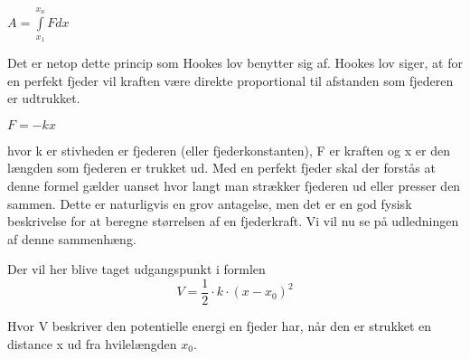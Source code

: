 \begin{center}
$A = \int\limits_{x_1}^{x_n} F dx$ 
\end{center}
\bigskip

Det er netop dette princip som Hookes lov benytter sig af. Hookes lov siger, at for en perfekt fjeder vil kraften være direkte proportional til afstanden som fjederen er udtrukket. 

\begin{center}
$F = -kx$
\end{center}
\bigskip

hvor k er stivheden er fjederen (eller fjederkonstanten), F er kraften og x er den længden som fjederen er trukket ud. Med en perfekt fjeder skal der forstås at denne formel gælder uanset hvor langt man strækker fjederen ud eller presser den sammen. Dette er naturligvis en grov antagelse, men det er en god fysisk beskrivelse for at beregne størrelsen af en fjederkraft. Vi vil nu se på udledningen af denne sammenhæng.

Der vil her blive taget udgangspunkt i formlen 
\begin{equation}
V=\dfrac{1}{2} \cdot k \cdot (x-x_{0})^2
\end{equation}

Hvor V beskriver den potentielle energi en fjeder har, når den er strukket en distance x ud fra hvilelængden $x_0$. 
